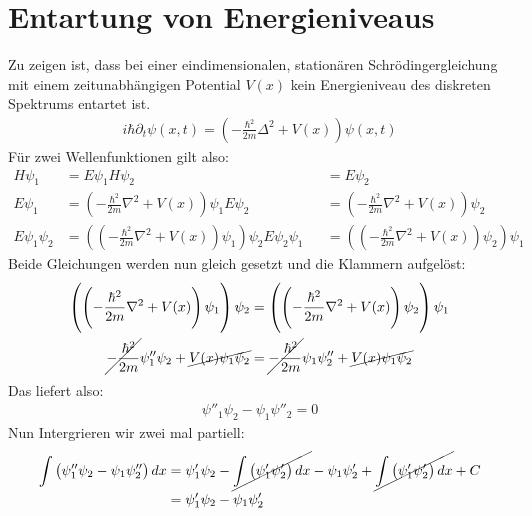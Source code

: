 \section{Entartung von Energieniveaus}
Zu zeigen ist, dass bei einer eindimensionalen, stationären Schrödingergleichung mit einem zeitunabhängigen Potential $V(x)$ kein Energieniveau des diskreten Spektrums entartet ist.
\begin{align}
  i\hbar\partial_t \psi(x,t)=\left(-\frac{\hbar^2}{2m}\Delta^2+V(x)\right)\psi(x,t)
\end{align}
Für zwei Wellenfunktionen gilt also:
\begin{align}
  H\psi_1&=E\psi_1		H\psi_2&&=E\psi_2		\\
  E\psi_1&=\left(-\frac{\hbar^2}{2m}\nabla^2+V(x)\right)\psi_1		E\psi_2&&=\left(-\frac{\hbar^2}{2m}\nabla^2+V(x)\right)\psi_2	\\
  E\psi_1\psi_2&=\left(\left(-\frac{\hbar^2}{2m}\nabla^2+V(x)\right)\psi_1\right)\psi_2		E\psi_2\psi_1&&=\left(\left(-\frac{\hbar^2}{2m}\nabla^2+V(x)\right)\psi_2\right)\psi_1
\end{align}
Beide Gleichungen werden nun gleich gesetzt und die Klammern aufgelöst:
\begin{align}
  \left(\left(-\frac{\hbar^2}{2m}\nabla^2+V(x)\right)\psi_1\right)\psi_2&=\left(\left(-\frac{\hbar^2}{2m}\nabla^2+V(x)\right)\psi_2\right)\psi_1	\\
  \cancel{-\frac{\hbar^2}{2m}}\psi''_1\psi_2+\cancel{V(x)\psi_1\psi_2}&=\cancel{-\frac{\hbar^2}{2m}}\psi_1\psi''_2+\cancel{V(x)\psi_1\psi_2}
\end{align}
Das liefert also:
\begin{align}
  \psi''_1\psi_2 - \psi_1\psi''_2 = 0
\end{align}
Nun Intergrieren wir zwei mal partiell:
\begin{align}
  \int \left(\psi''_1\psi_2 - \psi_1\psi''_2\right) dx &= \psi'_1\psi_2 - \cancel{\int \left(\psi'_1\psi'_2\right)dx} - \psi_1\psi'_2 + \cancel{\int \left(\psi'_1\psi'_2\right)dx} + C \\
  &= \psi'_1\psi_2 - \psi_1\psi'_2
\end{align}





